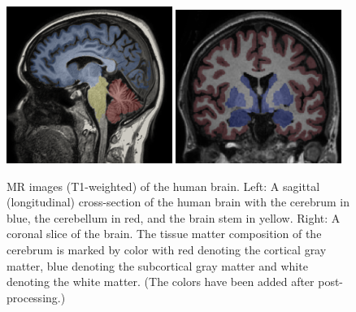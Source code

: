 \begin{figure}[t]
  \centering
  \includegraphics[width=0.48\textwidth]{./graphics/chp2/exp-brain.png}
  \includegraphics[width=0.48\textwidth]{./graphics/chp2/exp-matters.png}
  \caption{MR images (T1-weighted) of the human brain. Left: A sagittal
    (longitudinal) cross-section of the human brain with the cerebrum
    in blue, the cerebellum in red, and the brain stem in yellow. Right: A coronal
    slice of the brain. The tissue matter
    composition of the cerebrum is marked by color with red denoting
    the cortical gray matter, blue denoting the subcortical gray matter
    and white denoting the white matter. (The colors have been added after
    post-processing.)}
  \label{fig:chp2:brain}
\end{figure}

